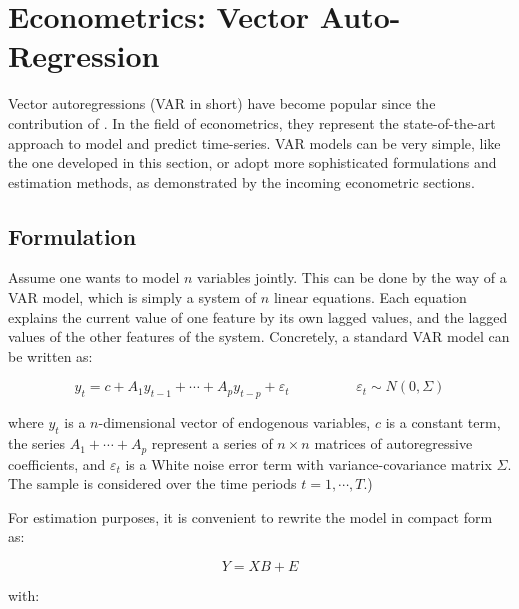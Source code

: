\section{Econometrics: Vector Auto-Regression}
\label{chapter3_section4}

Vector autoregressions (VAR in short) have become popular since the contribution of \cite{Sims1980}. In the field of econometrics, they represent the state-of-the-art approach to model and predict time-series. VAR models can be very simple, like the one developed in this section, or adopt more sophisticated formulations and estimation methods, as demonstrated by the incoming econometric sections.

\subsection{Formulation}
\label{chapter3_section4_subsection1}

Assume one wants to model $n$ variables jointly. This can be done by the way of a VAR model, which is simply a system of $n$ linear equations. Each equation explains the current value of one feature by its own lagged values, and the lagged values of the other features of the system. Concretely, a standard VAR model can be written as:

\begin{equation}
y_t = c + A_1 y_{t-1} + \cdots + A_p y_{t-p} + \varepsilon_t \hspace{2cm}
\varepsilon_t \sim N(0, \Sigma)
\label{equation_c3_s4_ss1_1}
\end{equation}

where $y_t$ is a $n$-dimensional vector of endogenous variables, $c$ is a constant term, the series $A_1 + \cdots + A_p$ represent a series of $n \times n$ matrices of autoregressive coefficients, and $\varepsilon_t$ is a White noise error term with variance-covariance matrix $\Sigma$. The sample is considered over the time periods $t= 1, \cdots, T$.)

For estimation purposes, it is convenient to rewrite the model in compact form as:

\begin{equation}
Y = XB + E
\label{equation_c3_s4_ss1_2}
\end{equation}

with:

